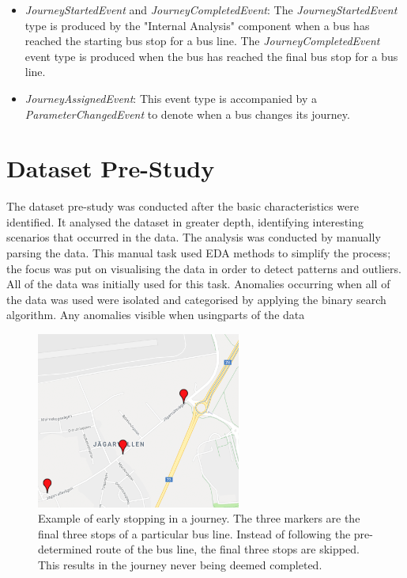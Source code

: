\begin{itemize}
    \item \textit{JourneyStartedEvent} and \textit{JourneyCompletedEvent}:
    The \textit{JourneyStartedEvent} type is produced by the "Internal Analysis" component when a bus has reached the starting bus stop for a bus line.
    The \textit{JourneyCompletedEvent} event type is produced when the bus has reached the final bus stop for a bus line.

    \item \textit{JourneyAssignedEvent}:
    This event type is accompanied by a \textit{ParameterChangedEvent} to denote when a bus changes its journey.
\end{itemize}

\section{Dataset Pre-Study}
The dataset pre-study was conducted after the basic characteristics were identified.
It analysed the dataset in greater depth, identifying interesting scenarios that occurred in the data.
The analysis was conducted by manually parsing the data.
This manual task used EDA methods to simplify the process; the focus was put on visualising the data in order to detect patterns and outliers.
All of the data was initially used for this task.
Anomalies occurring when all of the data was used were isolated and categorised by applying the binary search algorithm. 
Any anomalies visible when usingparts of the data


\begin{figure}[t!]
    \centering
    \includegraphics[width=0.6\textwidth]{figures/edge_case_early_quit}
    \caption{Example of early stopping in a journey.
    The three markers are the final three stops of a particular bus line.
    Instead of following the pre-determined route of the bus line, the final three stops are skipped.
    This results in the journey never being deemed completed.}
    \label{fig:human-error-early-stopping-1}
\end{figure}

